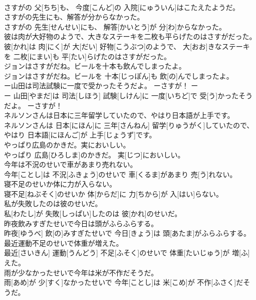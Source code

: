 \documentclass[8pt]{extreport}
\begin{document}
\begin{CJK}{UTF8}{min}
\\	さすがの 父[ちち]も、 今度[こんど]の 入院[にゅういん]はこたえたようだ。
\\	さすがの先生にも、解答が分からなかった。	
\\	さすがの 先生[せんせい]にも、 解答[かいとう]が 分[わ]からなかった。
\\	彼は肉が大好物のようで、大きなステーキを二枚も平らげたのはさすがだった。	
\\	彼[かれ]は 肉[にく]が 大[だい] 好物[こうぶつ]のようで、 大[おお]きなステーキを 二枚[にまい]も 平[たい]らげたのはさすがだった。
\\	ジョンはさすがだね。ビールを十本も飲んでしまったよ。	
\\	ジョンはさすがだね。ビールを 十本[じっぽん]も 飲[の]んでしまったよ。
\\	ー山田は司法試験に一度で受かったそうだよ。 ーさすが！	ー
\\	ー 山田[やまだ]は 司法[しほう] 試験[しけん]に 一度[いちど]で 受[う]かったそうだよ。 ーさすが！
\\	ネルソンさんは日本に三年留学していたので、やはり日本語が上手です。	
\\	ネルソンさんは 日本[にほん]に 三年[さんねん] 留学[りゅうがく]していたので、やはり 日本語[にほんご]が 上手[じょうず]です。
\\	やっぱり広島のかきだ。実においしい。	
\\	やっぱり 広島[ひろしま]のかきだ。 実[じつ]においしい。
\\	今年は不況のせいで車があまり売れない。	
\\	今年[ことし]は 不況[ふきょう]のせいで 車[くるま]があまり 売[う]れない。
\\	寝不足のせいか体に力が入らない。	
\\	寝不足[ねぶそく]のせいか 体[からだ]に 力[ちから]が 入[はい]らない。
\\	私が失敗したのは彼のせいだ。	
\\	私[わたし]が 失敗[しっぱい]したのは 彼[かれ]のせいだ。
\\	昨夜飲みすぎたせいで今日は頭がふらふらする。	
\\	昨夜[ゆうべ] 飲[の]みすぎたせいで 今日[きょう]は 頭[あたま]がふらふらする。
\\	最近運動不足のせいで体重が増えた。	
\\	最近[さいきん] 運動[うんどう] 不足[ふそく]のせいで 体重[たいじゅう]が 増[ふ]えた。
\\	雨が少なかったせいで今年は米が不作だそうだ。	
\\	雨[あめ]が 少[すく]なかったせいで 今年[ことし]は 米[こめ]が 不作[ふさく]だそうだ。

\end{CJK}
\end{document}
